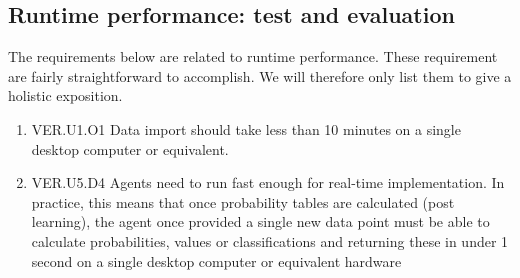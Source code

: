 \documentclass{article}
\theoremstyle{theorem}
\theoremstyle{definition}
\begin{document}
\subsection{Runtime performance: test and evaluation}

The requirements below are related to runtime performance.  These requirement are fairly straightforward to accomplish.  We will therefore only list them to give a holistic exposition.

\begin{enumerate}
\item VER.U1.O1 Data import should take less than 10 minutes  on a single desktop computer or equivalent.
\item VER.U5.D4 Agents need to run fast enough for real-time implementation. In practice, this means that once probability tables are calculated  (post learning), the agent once provided a single new data point must be able to calculate probabilities, values or classifications and returning these in under 1 second on a single desktop computer or equivalent hardware
\end{enumerate}

%
%
%






















\end{document}
